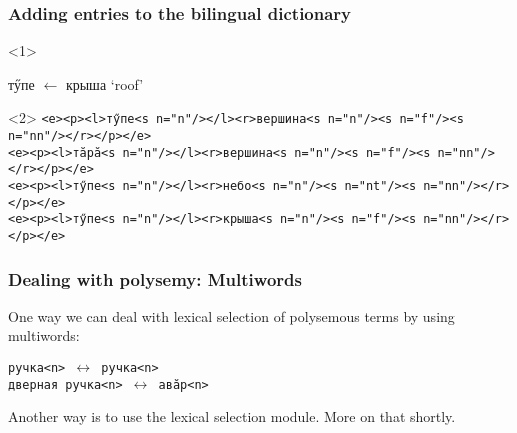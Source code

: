 \documentclass[10pt,xetex]{beamer} %
\begin{document}
\begin{frame}
 \frametitle{Adding entries to the bilingual dictionary}

\begin{onlyenv}<1>
\begin{center}
тӳпе $\leftarrow$ крыша `roof'
\end{center}
\end{onlyenv}
\begin{onlyenv}<2>
{\tt <e><p><l>тӳпе<s n="n"/></l><r>вершина<s n="n"/><s n="f"/><s n="nn"/></r></p></e>} \\
{\tt <e><p><l>тăрă<s n="n"/></l><r>вершина<s n="n"/><s n="f"/><s n="nn"/></r></p></e>}  \\
{\tt <e><p><l>тӳпе<s n="n"/></l><r>небо<s n="n"/><s n="nt"/><s n="nn"/></r></p></e>}\\
{\tt <e><p><l>тӳпе<s n="n"/></l><r>крыша<s n="n"/><s n="f"/><s n="nn"/></r></p></e>} \\

\end{onlyenv}

\end{frame}


\begin{frame}
  \frametitle{Dealing with polysemy: Multiwords}

\begin{block}{}
One way we can deal with lexical selection of polysemous terms by using
multiwords:


{\tt ручка<n>  $\leftrightarrow$ ручка<n>} \\
{\tt дверная ручка<n> $\leftrightarrow$ авăр<n>}

\end{block}

\begin{block}{}
Another way is to use the lexical selection module. More on that shortly.
\end{block}
\end{frame}
\end{document}

